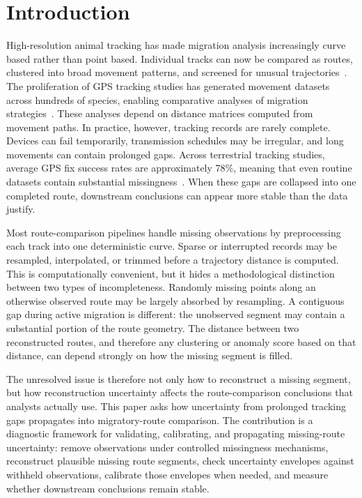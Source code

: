 \documentclass[pdflatex,sn-vancouver-num]{sn-jnl}
\begin{document}

\maketitle

\section{Introduction}\label{introduction}

High-resolution animal tracking has made migration analysis increasingly curve based rather than point based. Individual tracks can now be compared as routes, clustered into broad movement patterns, and screened for unusual trajectories~\cite{kranstauber2011,kays2022,nathan2022}. The proliferation of GPS tracking studies has generated movement datasets across hundreds of species, enabling comparative analyses of migration strategies~\cite{kays2015,sequeira2018}. These analyses depend on distance matrices computed from movement paths. In practice, however, tracking records are rarely complete. Devices can fail temporarily, transmission schedules may be irregular, and long movements can contain prolonged gaps. Across terrestrial tracking studies, average GPS fix success rates are approximately 78\%, meaning that even routine datasets contain substantial missingness~\cite{hofman2019}. When these gaps are collapsed into one completed route, downstream conclusions can appear more stable than the data justify.

Most route-comparison pipelines handle missing observations by preprocessing each track into one deterministic curve. Sparse or interrupted records may be resampled, interpolated, or trimmed before a trajectory distance is computed. This is computationally convenient, but it hides a methodological distinction between two types of incompleteness. Randomly missing points along an otherwise observed route may be largely absorbed by resampling. A contiguous gap during active migration is different: the unobserved segment may contain a substantial portion of the route geometry. The distance between two reconstructed routes, and therefore any clustering or anomaly score based on that distance, can depend strongly on how the missing segment is filled.

The unresolved issue is therefore not only how to reconstruct a missing segment, but how reconstruction uncertainty affects the route-comparison conclusions that analysts actually use. This paper asks how uncertainty from prolonged tracking gaps propagates into migratory-route comparison. The contribution is a diagnostic framework for validating, calibrating, and propagating missing-route uncertainty: remove observations under controlled missingness mechanisms, reconstruct plausible missing route segments, check uncertainty envelopes against withheld observations, calibrate those envelopes when needed, and measure whether downstream conclusions remain stable.
\end{document}
